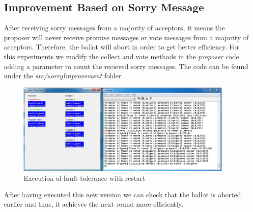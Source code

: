 \subsection{Improvement Based on Sorry Message}
After receiving sorry messages from a majority of acceptors, it means the
proposer will never receive promise messages or vote messages from a majority
of acceptors. Therefore, the ballot will abort in order to get better efficiency. For
this experiments we modify the collect and vote methods in the \textit{proposer} code
adding a parameter to count the recieved sorry messages. The code can be found
under the \textit{src/sorryImprovement} folder. 
\begin{figure}[h!]
  \centering
    \includegraphics[width=0.95\textwidth]{./3_Experiments/images/sorryImprovement.jpg}
    \caption{Execution of fault tolerance with restart \label{fig:sorryImprovement}}
\end{figure}
\newpage
After having executed this new version we can check that the ballot is aborted earlier
and thus, it achieves the next round more efficiently. 
